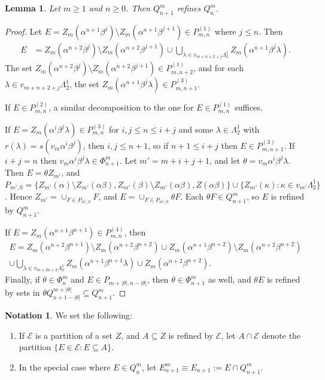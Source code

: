 \documentclass[12pt]{amsart}
\newcommand{\sm}{\setminus}
\newcommand{\sse}{\subseteq}
\newcommand{\mc}[1]{\mathcal{#1}}
\newcommand{\al}{\alpha}
\newcommand{\be}{\beta}
\renewcommand{\th}{\theta}
\newcommand{\ka}{\kappa}
\newcommand{\la}{\lambda}
\newcommand{\La}{\Lambda}
\theoremstyle{plain} %
\newtheorem{Lemma}[Theorem]{Lemma}
\theoremstyle{definition} %
\newtheorem{Notation}[Theorem]{Notation}
\begin{document}
\begin{Lemma}\label{lem Q_n+1 refines Q_n}
    Let $m \ge 1$ and $n \ge 0$. Then $Q_{n+1}^m$ refines $Q_n^m$.
\end{Lemma}
\begin{proof}
    Let $E = Z_m(\al^{n+1} \be^j) \sm Z_m(\al^{n+1}\be^{j+1}) \in P^{(1)}_{m,n}$ where $j \leq n$. Then
    \begin{align*}
        E &= Z_m(\al^{n+2} \be^j)\sm Z_m(\al^{n+2}\be^{j+1}) \cup \bigcup_{\la \in v_{m+n+2+j}\La_2^1} Z_m(\al^{n+1}\be^j \la).
    \end{align*}
    The set $Z_m(\al^{n+2} \be^j)\sm Z_m(\al^{n+2}\be^{j+1}) \in P_{m,n+2}^{(1)}$, and for each $\la \in v_{m+n+2+j}\La_2^1$, the set $Z_m(\al^{n+1}\be^j \la) \in P_{m,n+1}^{(3)}$.
    
    If $E \in P^{(2)}_{m,n}$, a similar decomposition to the one for $E \in P_{m,n}^{(1)}$ suffices.

    If $E = Z_m(\al^{i}\be^{j} \la) \in P^{(3)}_{m,n}$ for $i, j \le n \le i+j$ and some $\la \in \La_2^1$ with $r(\la) = s(v_m \al^i \be^j)$, then $i, j \le n+1$, so if $n+1 \le i+j$ then $E \in P^{(3)}_{m,n+1}$. If $i+j = n$ then $v_m \al^i \be^j \la \in \Phi_{n+1}^m$. Let $m' = m + i + j + 1$, and let $\th = v_m \al^i \be^j \la$. Then $E = \th Z_{m'}$, and $P_{m',0} = \{Z_{m'}(\al)\sm Z_{m'}(\al \be), Z_{m'}(\be)\sm Z_{m'}(\al \be), Z(\al\be)\} \cup \{Z_{m'}(\ka) : \ka \in v_{m'}\La_2^1\}$. Hence $Z_{m'} = \cup_{F \in P_{m',0}} F$, and $E = \cup_{F \in P_{m',0}} \th F$. Each $\th F \in Q_{n+1}^{m}$, so $E$ is refined by $Q_{n+1}^m$.
    
    If $E = Z_m(\al^{n+1} \be^{n+1}) \in P^{(4)}_{m,n}$, then 
    \begin{multline*}
        E = Z_m(\al^{n+2} \be^{n+1}) \sm Z_m(\al^{n+2} \be^{n+2}) \cup Z_m(\al^{n+1} \be^{n+2}) \sm Z_m(\al^{n+2} \be^{n+2}) \\ \cup \bigcup_{\la \in v_{m+2n+2}\La_2^1} Z_m(\al^{n+1}\be^{n+1}\la) \cup Z_m(\al^{n+2}\be^{n+2}).
    \end{multline*}
    Finally, if $\th \in \Phi_n^m$ and $E \in P_{m+|\th|, n-|\th|}$, then $\th \in \Phi_{n+1}^m$ as well, and $\th E$ is refined by sets in $\th Q^{m+|\th|}_{n+1-|\th|} \sse Q_{n+1}^m$.
\end{proof}

\begin{Notation} We set the following:
\begin{enumerate}[(1)]
    \item If $\mc{E}$ is a partition of a set $Z$, and $A \sse Z$ is refined by $\mc{E}$, let $A \cap \mc{E}$ denote the partition $\{ E \in \mc{E} : E \sse A\}$.

    \item In the special case where $E \in Q_{n}^{m}$, let $E^m_{n+1} \equiv E_{n+1} := E \cap Q_{n+1}^m$.
\end{enumerate}
\end{Notation}
\end{document}
